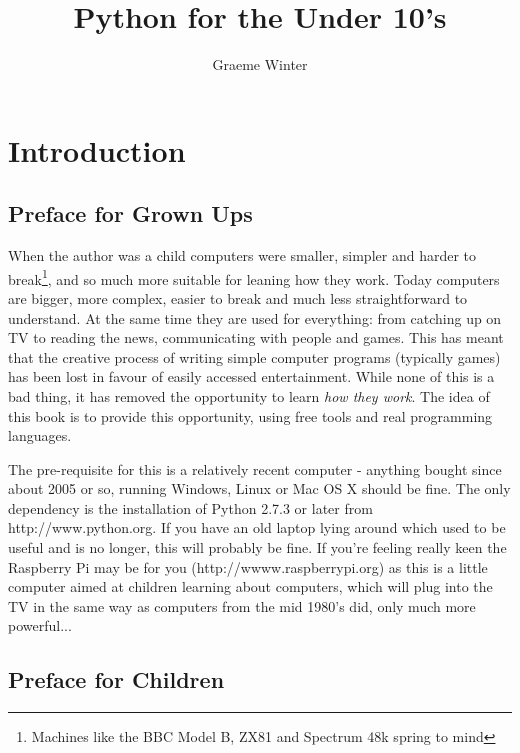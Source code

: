 \documentclass[a4paper, 11pt]{book}
\title{Python for the Under 10's}
\author{Graeme Winter}
\begin{document}
\maketitle
\clearpage
\thispagestyle{plain}
\par\vspace*{.35\textheight}{\centering For Emily, I hope you find
  this fun\par}
\chapter{Introduction}

\section{Preface for Grown Ups}

When the author was a child computers were smaller, simpler and harder
to break\footnote{Machines like the BBC Model B, ZX81 and Spectrum 48k
  spring to mind}, and so much more suitable for leaning how they
work. Today computers are bigger, more complex, easier to break and
much less straightforward to understand. At the same time they are
used for everything: from catching up on TV to reading the news,
communicating with people and games. This has meant that the creative
process of writing simple computer programs (typically games) has been
lost in favour of easily accessed entertainment. While none of this is
a bad thing, it has removed the opportunity to learn \emph{how they
  work}. The idea of this book is to provide this opportunity, using
free tools and real programming languages. 

The pre-requisite for this is a relatively recent computer - anything
bought since about 2005 or so, running Windows, Linux or Mac OS X
should be fine. The only dependency is the installation of Python
2.7.3 or later from http://www.python.org. If you have an old laptop
lying around which used to be useful and is no longer, this will
probably be fine. If you're feeling really keen the Raspberry Pi may
be for you (http://wwww.raspberrypi.org) as this is a little computer
aimed at children learning about computers, which will plug into the
TV in the same way as computers from the mid 1980's did, only much
more powerful... 

\section{Preface for Children}
\end{document}
